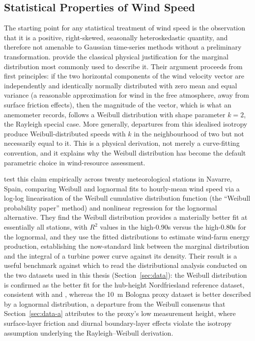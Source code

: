 \documentclass[11pt, a4paper, twoside]{article}
\begin{document}
\subsection{Statistical Properties of Wind Speed}
\label{sec:lit-stats}

The starting point for any statistical treatment of wind speed is the observation that it is a positive, right-skewed, seasonally heteroskedastic quantity, and therefore not amenable to Gaussian time-series methods without a preliminary transformation. \citet{TullerBrett1984} provide the classical physical justification for the marginal distribution most commonly used to describe it. Their argument proceeds from first principles: if the two horizontal components of the wind velocity vector are independently and identically normally distributed with zero mean and equal variance (a reasonable approximation for wind in the free atmosphere, away from surface friction effects), then the magnitude of the vector, which is what an anemometer records, follows a Weibull distribution with shape parameter $k = 2$, the Rayleigh special case. More generally, departures from this idealised isotropy produce Weibull-distributed speeds with $k$ in the neighbourhood of two but not necessarily equal to it. This is a physical derivation, not merely a curve-fitting convention, and it explains why the Weibull distribution has become the default parametric choice in wind-resource assessment.

\citet{Garcia1998} test this claim empirically across twenty meteorological stations in Navarre, Spain, comparing Weibull and lognormal fits to hourly-mean wind speed via a log-log linearisation of the Weibull cumulative distribution function (the ``Weibull probability paper'' method) and nonlinear regression for the lognormal alternative. They find the Weibull distribution provides a materially better fit at essentially all stations, with $R^2$ values in the high-0.90s versus the high-0.80s for the lognormal, and they use the fitted distributions to estimate wind-farm energy production, establishing the now-standard link between the marginal distribution and the integral of a turbine power curve against its density. Their result is a useful benchmark against which to read the distributional analysis conducted on the two datasets used in this thesis (Section~\ref{sec:data}): the Weibull distribution is confirmed as the better fit for the hub-height Nordfriesland reference dataset, consistent with \citet{Garcia1998} and \citet{TullerBrett1984}, whereas the 10~m Bologna proxy dataset is better described by a lognormal distribution, a departure from the Weibull consensus that Section~\ref{sec:data-a} attributes to the proxy's low measurement height, where surface-layer friction and diurnal boundary-layer effects violate the isotropy assumption underlying the Rayleigh--Weibull derivation.
\end{document}
